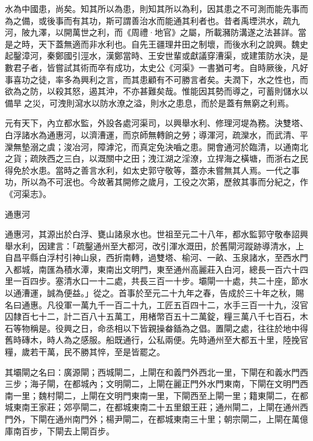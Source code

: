 
\begin{pinyinscope}

 水為中國患，尚矣。知其所以為患，則知其所以為利，因其患之不可測而能先事而為之備，或後事而有其功，斯可謂善治水而能通其利者也。昔者禹堙洪水，疏九河，陂九澤，以開萬世之利，而《周禮·地官》之屬，所載瀦防溝遂之法甚詳。當是之時，天下蓋無適而非水利也。自先王疆理井田之制壞，而後水利之說興。魏史起鑿漳河，秦鄭國引涇水，漢鄭當時、王安世輩或獻議穿漕渠，或建策防水決，是數君子者，皆嘗試其術而卒有成功，太史公《河渠》一書猶可考。自時厥後，凡好事喜功之徒，率多為興利之言，而其患顧有不可勝言者矣。夫潤下，水之性也，而欲為之防，以殺其怒，遏其沖，不亦甚難矣哉。惟能因其勢而導之，可蓄則儲水以備旱之災，可洩則瀉水以防水潦之溢，則水之患息，而於是蓋有無窮之利焉。



 元有天下，內立都水監，外設各處河渠司，以興舉水利、修理河堤為務。決雙塔、白浮諸水為通惠河，以濟漕運，而京師無轉餉之勞；導渾河，疏灤水，而武清、平灤無墊溺之虞；浚冶河，障滹沱，而真定免決嚙之患。開會通河於臨清，以通南北之貨；疏陜西之三白，以溉關中之田；洩江湖之淫潦，立捍海之橫塘，而浙右之民得免於水患。當時之善言水利，如太史郭守敬等，蓋亦未嘗無其人焉。一代之事功，所以為不可泯也。今故著其開修之歲月，工役之次第，歷敘其事而分紀之，作《河渠志》。



 通惠河



 通惠河，其源出於白浮、甕山諸泉水也。世祖至元二十八年，都水監郭守敬奉詔興舉水利，因建言：「疏鑿通州至大都河，改引渾水溉田，於舊閘河蹤跡導清水，上自昌平縣白浮村引神山泉，西折南轉，過雙塔、榆河、一畝、玉泉諸水，至西水門入都城，南匯為積水潭，東南出文明門，東至通州高麗莊入白河，總長一百六十四里一百四步。塞清水口一十二處，共長三百一十步。壩閘一十處，共二十座，節水以通漕運，誠為便益。」從之。首事於至元二十九年之春，告成於三十年之秋，賜名曰通惠。凡役軍一萬九千一百二十九，工匠五百四十二，水手三百一十九，沒官囚隸百七十二，計二百八十五萬工，用楮幣百五十二萬錠，糧三萬八千七百石，木石等物稱是。役興之日，命丞相以下皆親操畚鍤為之倡。置閘之處，往往於地中得舊時磚木，時人為之感服。船既通行，公私兩便。先時通州至大都五十里，陸挽官糧，歲若干萬，民不勝其悴，至是皆罷之。



 其壩閘之名曰：廣源閘；西城閘二，上閘在和義門外西北一里，下閘在和義水門西三步；海子閘，在都城內；文明閘二，上閘在麗正門外水門東南，下閘在文明門西南一里；魏村閘二，上閘在文明門東南一里，下閘西至上閘一里；籍東閘二，在都城東南王家莊；郊亭閘二，在都城東南二十五里銀王莊；通州閘二，上閘在通州西門外，下閘在通州南門外；楊尹閘二，在都城東南三十里；朝宗閘二，上閘在萬億庫南百步，下閘去上閘百步。




\end{pinyinscope}
